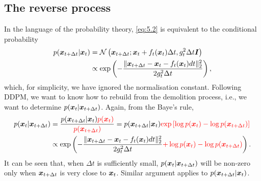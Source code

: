 \subsection{The reverse process}
In the language of the probability theory, \cref{eq:5.2} is equivalent to the conditional probability
\begin{align}
    p(\bm{x}_{t+\Delta t}|\bm{x}_t)&=\mathcal{N}\left( \bm{x}_{t+\Delta t}; \bm{x}_t+f_t(\bm{x}_t)\Delta t,g_t^2\Delta t\bm{I}\right)\nonumber\\
    &\propto \exp\left(-\frac{\| \bm{x}_{t+\Delta t}-\bm{x}_{t}-f_t(\bm{x}_{t})dt\|_2^2}{2g_t^2\Delta t}\right),\label{eq:5.3}
\end{align}
which, for simplicity, we have ignored the normalisation constant. Following DDPM, we want to know how to rebuild from the demolition process, i.e., we want to determine $p(\bm{x}_{t}|\bm{x}_{t+\Delta t})$. Again, from the Baye's rule,
\begin{align}
  p(\bm{x}_{t}|\bm{x}_{t+\Delta t})&=\frac{p(\bm{x}_{t+\Delta t}|\bm{x}_t) \textcolor{red}{p(\bm{x}_{t})} }{\textcolor{red}{p(\bm{x}_{t+\Delta t})}} = p(\bm{x}_{t+\Delta t}|\bm{x}_t)\textcolor{red}{\exp\left[ \log p(\bm{x}_{t}) - \log p(\bm{x}_{t+\Delta t}) \right]} \nonumber\\
  &\propto \exp \left( -\frac{\| \bm{x}_{t+\Delta t}-\bm{x}_{t}-f_t(\bm{x}_{t})dt\|_2^2}{2g_t^2\Delta t} \textcolor{red}{  + \log p(\bm{x}_{t}) - \log p(\bm{x}_{t+\Delta t})}  \right).\label{eq:5.4}
\end{align}
It can be seen that, when $\Delta t$ is sufficiently small, $p(\bm{x}_{t}|\bm{x}_{t+\Delta t})$ will  be non-zero only when $\bm{x}_{t+\Delta t}$ is very close to $\bm{x}_t$. Similar argument applies to $p(\bm{x}_{t+\Delta t}|\bm{x}_t)$. 

